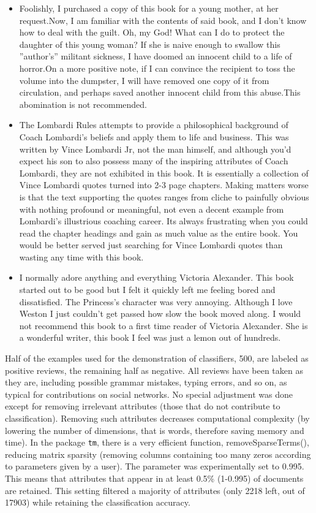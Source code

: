 \begin{itemize}
    \item Foolishly, I purchased a copy of this book for a young mother, at her request.Now,
I am familiar with the contents of said book, and I don’t know how to deal with
the guilt. Oh, my God! What can I do to protect the daughter of this young
woman? If she is naive enough to swallow this ”author’s” militant sickness, I
have doomed an innocent child to a life of horror.On a more positive note, if I
can convince the recipient to toss the volume into the dumpster, I will have removed one copy of it from circulation, and perhaps saved another innocent child
from this abuse.This abomination is not recommended.

    \item The Lombardi Rules attempts to provide a philosophical background of Coach
Lombardi’s beliefs and apply them to life and business. This was written by Vince
Lombardi Jr, not the man himself, and although you’d expect his son to also possess many of the inspiring attributes of Coach Lombardi, they are not exhibited
in this book. It is essentially a collection of Vince Lombardi quotes turned into
2-3 page chapters. Making matters worse is that the text supporting the quotes
ranges from cliche to painfully obvious with nothing profound or meaningful,
not even a decent example from Lombardi’s illustrious coaching career. Its always frustrating when you could read the chapter headings and gain as much
value as the entire book. You would be better served just searching for Vince
Lombardi quotes than wasting any time with this book.

\item I normally adore anything and everything Victoria Alexander. This book started
out to be good but I felt it quickly left me feeling bored and dissatisfied. The
Princess’s character was very annoying. Although I love Weston I just couldn’t
get passed how slow the book moved along. I would not recommend this book
to a first time reader of Victoria Alexander. She is a wonderful writer, this book I
feel was just a lemon out of hundreds.
\end{itemize}

Half of the examples used for the demonstration of classifiers, 500, are labeled as positive reviews, the remaining half as negative. All reviews have
been taken as they are, including possible grammar mistakes, typing errors, and so on, as typical for contributions on social networks. No special adjustment was done except for removing irrelevant attributes (those that do not contribute to classification). Removing such attributes decreases computational complexity (by lowering the number of dimensions, that is words, therefore saving memory and time). In the package \texttt{tm}, there is a very efficient function,
removeSparseTerms(), reducing matrix sparsity (removing columns containing too many zeros according to parameters given by a user). The parameter was
experimentally set to 0.995. This means that attributes that appear in at least 0.5\%
(1-0.995) of documents are retained. This setting filtered a majority of attributes
(only 2218 left, out of 17903) while retaining the classification accuracy.

